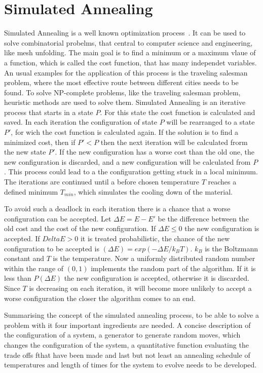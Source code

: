 \documentclass[draft,final]{vutinfth} %
\begin{document}
\section{Simulated Annealing}
\label{sec:sa}
Simulated Annealing is a well known optimization process~\cite{kirkpatrick1983optimization}. It can be used to solve combinatorial probelms, that central to computer science and engineering, like mesh unfolding. The main goal is to find a minimum or a maximum vlaue of a function, which is called the cost function, that has many independet variables. An usual examples for the application of this process is the traveling salesman problem, where the most effective route between different cities needs to be found. To solve NP-complete problems, like the traveling salesman problem, heuristic methods are used to solve them.
Simulated Annealing is an iterative process that starts in a state $P$. For this state the cost function is calculated and saved. In each iteration the configuration of state $P$ will be rearranged to a state $P'$, for wich the cost function is calculated again. If the solution is to find a minimized cost, then if $P' < P$ then the next iteration will be calculated frorm the new state $P'$. If the new configuration has a worse cost than the old one, the new configuration is discarded, and a new configuration will be calculated from $P$. This process could lead to a the configuration getting stuck in a local minimum. The iterations are continued until a before chosen temperature $T$ reaches a defined minimum $T_{min}$, which simulates the cooling down of the material.

To avoid such a deadlock in each iteration there is a chance that a worse configuration can be accepted. Let $\Delta E = E - E'$ be the difference between the old cost and the cost of the new configuration. If $\Delta E \leq 0$ the new configuration is accepted. If $Delta E > 0$ it is treated probabilistic, the chance of the new configuration to be accepted is $(\Delta E) = exp(-\Delta E / k_B T)$. $k_B$ is the Boltzmann constant and $T$ is the temperature. Now a uniformly distributed random number within the range of $(0,1)$ implements the random part of the algorithm. If it is less than $P(\Delta E)$ the new configuration is accepted, otherwise it is discarded. Since $T$ is decreasing on each iteration, it will become more unlikely to accept a worse configuration the closer the algorithm comes to an end.

Summarising the concept of the simulated annealing process, to be able to solve a problem with it four important ingredients are needed. A concise description of the configuration of a system, a generator to generate random moves, which changes the configuration of the system, a quantitative function evaluating the trade offs fthat have been made and last but not least an annealing schedule of temperatures and length of times for the system to evolve needs to be developed.
\end{document}
